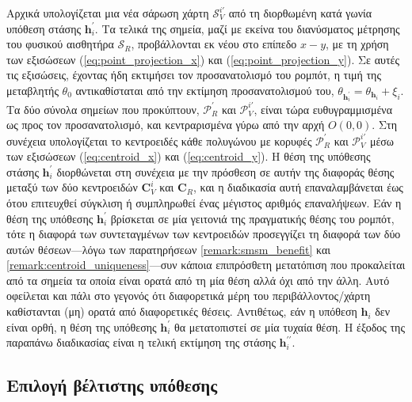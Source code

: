 Αρχικά υπολογίζεται μια νέα σάρωση χάρτη $\mathcal{S}_V^{i\prime}$ από τη
διορθωμένη κατά γωνία υπόθεση στάσης $\bm{h}_i^\prime$. Τα τελικά της σημεία,
μαζί με εκείνα του διανύσματος μέτρησης του φυσικού αισθητήρα $\mathcal{S}_R$,
προβάλλονται εκ νέου στο επίπεδο $x-y$, με τη χρήση των εξισώσεων
(\ref{eq:point_projection_x}) και (\ref{eq:point_projection_y}). Σε αυτές τις
εξισώσεις, έχοντας ήδη εκτιμήσει τον προσανατολισμό του ρομπότ, η τιμή της
μεταβλητής $\theta_0$ αντικαθίσταται από την εκτίμηση προσανατολισμού του,
$\theta_{\bm{h}_i^\prime} = \theta_{\bm{h}_i} + \xi_i$. Τα δύο σύνολα σημείων
που προκύπτουν, $\mathcal{P}_R^\prime$ και $\mathcal{P}_V^{i\prime}$, είναι
τώρα ευθυγραμμισμένα ως προς τον προσανατολισμό, και κεντραρισμένα γύρω από την
αρχή $O(0,0)$. Στη συνέχεια υπολογίζεται το κεντροειδές κάθε πολυγώνου με
κορυφές $\mathcal{P}_R^\prime$ και $\mathcal{P}_V^{i\prime}$ μέσω των εξισώσεων
(\ref{eq:centroid_x}) και (\ref{eq:centroid_y}). Η θέση της υπόθεσης στάσης
$\bm{h}_i^\prime$ διορθώνεται στη συνέχεια με την πρόσθεση σε αυτήν της
διαφοράς θέσης μεταξύ των δύο κεντροειδών $\bm{C}_V^i$ και $\bm{C}_R$, και η
διαδικασία αυτή επαναλαμβάνεται έως ότου επιτευχθεί σύγκλιση ή συμπληρωθεί ένας
μέγιστος αριθμός επαναλήψεων. Εάν η θέση της υπόθεσης $\bm{h}_i^\prime$
βρίσκεται σε μία γειτονιά της πραγματικής θέσης του ρομπότ, τότε η διαφορά των
συντεταγμένων των κεντροειδών προσεγγίζει τη διαφορά των δύο αυτών
θέσεων---λόγω των παρατηρήσεων \ref{remark:smsm_benefit} και
\ref{remark:centroid_uniqueness}---συν κάποια επιπρόσθετη μετατόπιση που
προκαλείται από τα σημεία τα οποία είναι ορατά από τη μία θέση αλλά όχι από την
άλλη. Αυτό οφείλεται και πάλι στο γεγονός ότι διαφορετικά μέρη του
περιβάλλοντος/χάρτη καθίστανται (μη) ορατά από διαφορετικές θέσεις. Αντιθέτως,
εάν η υπόθεση $\bm{h}_i$ δεν είναι ορθή, η θέση της υπόθεσης $\bm{h}_i^\prime$
θα μετατοπιστεί σε μία τυχαία θέση. Η έξοδος της παραπάνω διαδικασίας είναι η
τελική εκτίμηση της στάσης $\bm{h}_i^{\prime\prime}$.


\subsection{Επιλογή βέλτιστης υπόθεσης}
\label{subsection:02_03_03:04}

